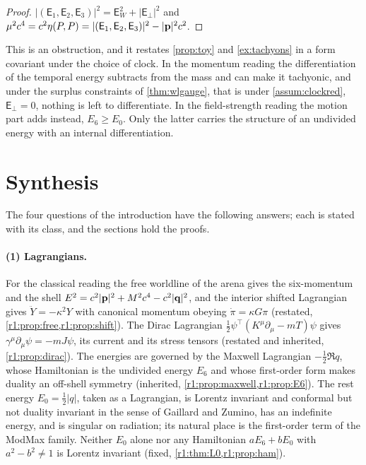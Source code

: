 \begin{proof}
$|(\mathsf E_1,\mathsf E_2,\mathsf E_3)|^2=\mathsf E_W^2+|\mathsf E_\perp|^2$ and $\mu^2c^4=c^2\eta(P,P)=|(\mathsf E_1,\mathsf E_2,\mathsf E_3)|^2-|\mathbf p|^2c^2$.
\end{proof}

This is an obstruction, and it restates \cref{prop:toy} and \cref{ex:tachyons} in a form covariant under the choice of clock. In the momentum
reading the differentiation of the temporal energy subtracts from the mass and can make it tachyonic, and under the surplus constraints of \cref{thm:wlgauge}, that is under \cref{assum:clockred}, $\mathsf E_\perp=0$, nothing is left to differentiate. In the field-strength reading the motion part adds instead,
$E_6\ge E_0$. Only the latter carries the structure of an undivided energy with an internal differentiation.


\section{Synthesis}
\label{r5:sec:main}

The four questions of the introduction have the following answers; each is stated with its class, and the sections hold the proofs.

\paragraph{(1) Lagrangians.} For the classical reading the free worldline of the arena gives the six-momentum and the shell
$E^2=c^2|\mathbf p|^2+M^2c^4-c^2|\mathbf q|^2$, and the interior shifted Lagrangian gives $\ddot Y=-\kappa^2Y$ with canonical momentum obeying
$\dot\pi=\kappa G\pi$ (restated, \cref{r1:prop:free,r1:prop:shift}). The Dirac Lagrangian $\tfrac12\psi^{\!\top}(K^\mu\partial_\mu-mT)\psi$ gives
$\gamma^\mu\partial_\mu\psi=-mJ\psi$, its current and its stress tensors (restated and inherited, \cref{r1:prop:dirac}). The energies are
governed by the Maxwell Lagrangian $-\tfrac12\Re q$, whose Hamiltonian is the undivided energy $E_6$ and whose first-order form makes
duality an off-shell symmetry (inherited, \cref{r1:prop:maxwell,r1:prop:E6}). The rest energy $E_0=\tfrac12|q|$, taken as a Lagrangian, is
Lorentz invariant and conformal but not duality invariant in the sense of Gaillard and Zumino, has an indefinite energy, and is singular on
radiation; its natural place is the first-order term of the ModMax family. Neither $E_0$ alone nor any Hamiltonian $aE_6+bE_0$ with
$a^2-b^2\neq1$ is Lorentz invariant (fixed, \cref{r1:thm:L0,r1:prop:ham}).

